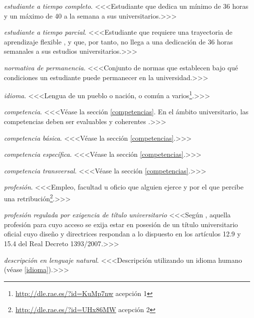    \item \emph{estudiante a tiempo completo}. <<<Estudiante que dedica un mínimo de 36 horas y un máximo de 40 a la semana a sus universitarios\cite[artículo 4, apartado 4]{rdECTS}.>>>

    \item \emph{estudiante a tiempo parcial}. <<<Estudiante que requiere una trayectoria de aprendizaje flexible \cite[artículo 7, apartado 2]{estatutoEstudiante}, y que, por tanto, no llega a una dedicación de 36 horas semanales a sus estudios universitarios.>>>

    \item \emph{normativa de permanencia}. <<<Conjunto de normas que establecen bajo qué condiciones un estudiante puede permanecer en la universidad.>>>

    \item \label{idioma} \emph{idioma}. <<<Lengua de un pueblo o nación, o común a varios\footnote{\url{http://dle.rae.es/?id=KuMp7nw} acepción 1}.>>>

    \item \emph{competencia}. <<<Véase la sección \ref{competencias}.  En el ámbito universitario, las competencias deben ser evaluables y coherentes \cite[página 19]{guiaAneca}.>>>

    \item \emph{competencia básica}. <<<Véase la sección \ref{competencias}.>>>

    \item \emph{competencia específica}. <<<Véase la sección \ref{competencias}.>>>

    \item \emph{competencia transversal}. <<<Véase la sección \ref{competencias}.>>>

    \item \emph{profesión}. <<<Empleo, facultad u oficio que alguien ejerce y por el que percibe una retribución\footnote{\url{http://dle.rae.es/?id=UHx86MW} acepción 2}.>>>

    \item \emph{profesión regulada por exigencia de título universitario} <<<Según \cite[artículo 4, apartado c]{rdECTS}, aquella profesión para cuyo acceso se exija estar en posesión de un título universitario oficial cuyo diseño y directrices respondan a lo dispuesto en los artículos 12.9 y 15.4 del Real Decreto 1393/2007\cite{rd1393}.>>>

    \item \emph{descripción en lenguaje natural}. <<<Descripción utilizando un idioma humano (véase \ref{idioma}).>>>

